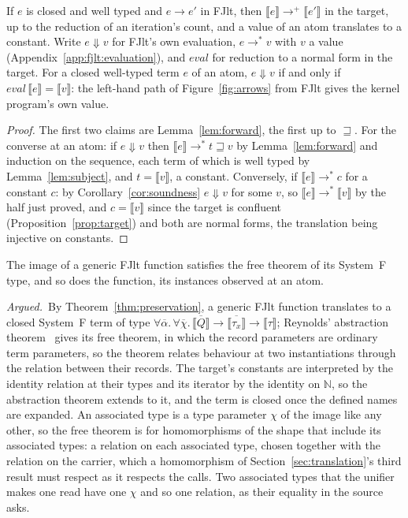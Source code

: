 \begin{theorem}[Simulation]
\label{thm:simulation}
If $e$ is closed and well typed and $e \longrightarrow e'$ in FJlt, then $\llbracket e \rrbracket \longrightarrow^{+} \llbracket e' \rrbracket$ in the target, up to the reduction of an iteration's count, and a value of an atom translates to a constant.
Write $e \Downarrow v$ for FJlt's own evaluation, $e \longrightarrow^{*} v$ with $v$ a value (Appendix~\ref{app:fjlt:evaluation}), and $\mathit{eval}$ for reduction to a normal form in the target.
For a closed well-typed term $e$ of an atom, $e \Downarrow v$ if and only if $\mathit{eval}\,\llbracket e \rrbracket = \llbracket v \rrbracket$: the left-hand path of Figure~\ref{fig:arrows} from FJlt gives the kernel program's own value.
\end{theorem}
\begin{proof}
The first two claims are Lemma~\ref{lem:forward}, the first up to $\sqsupseteq$.
For the converse at an atom: if $e \Downarrow v$ then $\llbracket e \rrbracket \longrightarrow^{*} t \sqsupseteq v$ by Lemma~\ref{lem:forward} and induction on the sequence, each term of which is well typed by Lemma~\ref{lem:subject}, and $t = \llbracket v \rrbracket$, a constant.
Conversely, if $\llbracket e \rrbracket \longrightarrow^{*} c$ for a constant $c$: by Corollary~\ref{cor:soundness} $e \Downarrow v$ for some $v$, so $\llbracket e \rrbracket \longrightarrow^{*} \llbracket v \rrbracket$ by the half just proved, and $c = \llbracket v \rrbracket$ since the target is confluent (Proposition~\ref{prop:target}) and both are normal forms, the translation being injective on constants.
\end{proof}

\begin{corollary}[Parametricity]
\label{cor:parametricity}
The image of a generic FJlt function satisfies the free theorem of its System~F type, and so does the function, its instances observed at an atom.
\end{corollary}
\noindent\emph{Argued.}\ By Theorem~\ref{thm:preservation}, a generic FJlt function translates to a closed System~F term of type $\forall\overline{\alpha}.\,\forall\overline{\chi}.\,\overline{\llbracket Q \rrbracket} \to \overline{\llbracket \tau_x \rrbracket} \to \llbracket \tau \rrbracket$; Reynolds' abstraction theorem~\cite{reynolds1983types,wadler1989theorems} gives its free theorem, in which the record parameters are ordinary term parameters, so the theorem relates behaviour at two instantiations through the relation between their records.
The target's constants are interpreted by the identity relation at their types and its iterator by the identity on $\mathbb{N}$, so the abstraction theorem extends to it, and the term is closed once the defined names are expanded.
An associated type is a type parameter $\chi$ of the image like any other, so the free theorem is for homomorphisms of the shape that include its associated types: a relation on each associated type, chosen together with the relation on the carrier, which a homomorphism of Section~\ref{sec:translation}'s third result must respect as it respects the calls.
Two associated types that the unifier makes one read have one $\chi$ and so one relation, as their equality in the source asks.

